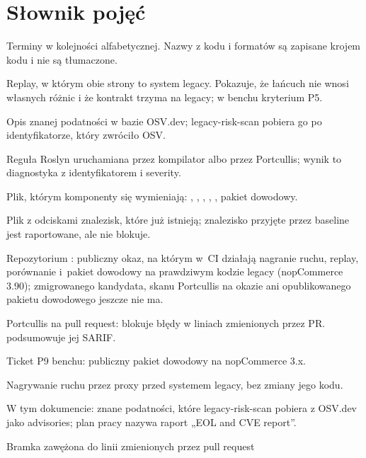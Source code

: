 \section{Słownik pojęć}\label{sec:slownik}

Terminy w kolejności alfabetycznej. Nazwy z kodu i formatów są zapisane krojem kodu i
nie są tłumaczone.

\begin{description}[style=nextline, leftmargin=1.2em, font=\normalfont\bfseries]
  \item[A/A replay] Replay, w którym obie strony to system legacy. Pokazuje, że łańcuch
        nie wnosi własnych różnic i że kontrakt trzyma na legacy; w benchu kryterium P5.
  \item[advisory] Opis znanej podatności w bazie OSV.dev; legacy-risk-scan pobiera go po
        identyfikatorze, który zwróciło OSV.
  \item[analyzer] Reguła Roslyn uruchamiana przez kompilator albo przez Portcullis;
        wynik to diagnostyka z identyfikatorem i severity.
  \item[artefakt] Plik, którym komponenty się wymieniają: ,
        , , ,
        , pakiet dowodowy.
  \item[baseline (Portcullis)] Plik z odciskami znalezisk, które już istnieją; znalezisko
        przyjęte przez baseline jest raportowane, ale nie blokuje.
  \item[bench (okaz)] Repozytorium :
        publiczny okaz, na którym w~CI działają nagranie ruchu, replay, porównanie i~pakiet
        dowodowy na prawdziwym kodzie legacy (nopCommerce 3.90); zmigrowanego kandydata,
        skanu Portcullis na okazie ani opublikowanego pakietu dowodowego jeszcze nie ma.
  \item[bramka (gate)] Portcullis na pull request: blokuje błędy w liniach zmienionych
        przez PR.  podsumowuje jej SARIF.
  \item[bramka fazy 01] Ticket P9 benchu: publiczny pakiet dowodowy na nopCommerce 3.x.
  \item[capture] Nagrywanie ruchu przez proxy  przed systemem legacy,
        bez zmiany jego kodu.
  \item[CVE] W tym dokumencie: znane podatności, które legacy-risk-scan pobiera z OSV.dev jako
        advisories; plan pracy nazywa raport „EOL and CVE report”.
  \item[diff gate] Bramka zawężona do linii zmienionych przez pull request

\end{description}
